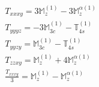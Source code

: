 \documentclass[fleqn,8pt,landscape]{jsarticle}
\begin{document}
\begin{align*}
& T_{xxxy} = 3 \mathbb{M}_{z}^{(1)} - 3 \mathbb{M}_{z}^{\alpha(1)} \\
& T_{yyyz} = - 3 \mathbb{M}_{3c}^{(1)} - \mathbb{T}_{4s}^{(1)} \\
& T_{yyzy} = \mathbb{M}_{3c}^{(1)} - \mathbb{T}_{4s}^{(1)} \\
& T_{zzxy} = \mathbb{M}_{z}^{(1)} + 4 \mathbb{M}_{z}^{\alpha(1)} \\
& \frac{T_{xxxy}}{3} = \mathbb{M}_{z}^{(1)} - \mathbb{M}_{z}^{\alpha(1)}
\end{align*}
\end{document}
